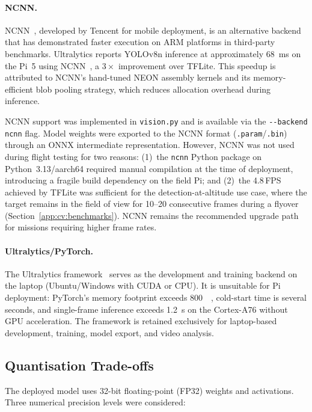\paragraph{NCNN.}
NCNN~\cite{ncnn}, developed by Tencent for mobile deployment, is an alternative backend that has demonstrated faster execution on ARM platforms in third-party benchmarks.  Ultralytics reports YOLOv8n inference at approximately \SI{68}{\milli\second} on the Pi~5 using NCNN~\cite{yolov8}, a $3\times$ improvement over TFLite.  This speedup is attributed to NCNN's hand-tuned NEON assembly kernels and its memory-efficient blob pooling strategy, which reduces allocation overhead during inference.

NCNN support was implemented in \texttt{vision.py} and is available via the \texttt{-{}-backend ncnn} flag.  Model weights were exported to the NCNN format (\texttt{.param}/\texttt{.bin}) through an ONNX intermediate representation.  However, NCNN was not used during flight testing for two reasons: (1)~the \texttt{ncnn} Python package on Python~3.13/aarch64 required manual compilation at the time of deployment, introducing a fragile build dependency on the field Pi; and (2)~the 4.8\,FPS achieved by TFLite was sufficient for the detection-at-altitude use case, where the target remains in the field of view for 10--20 consecutive frames during a flyover (Section~\ref{app:cv:benchmarks}).  NCNN remains the recommended upgrade path for missions requiring higher frame rates.

\paragraph{Ultralytics/PyTorch.}
The Ultralytics framework~\cite{yolov8} serves as the development and training backend on the laptop (Ubuntu/Windows with CUDA or CPU).  It is unsuitable for Pi deployment: PyTorch's memory footprint exceeds \SI{800}{\mega\byte}, cold-start time is several seconds, and single-frame inference exceeds \SI{1.2}{\second} on the Cortex-A76 without GPU acceleration.  The framework is retained exclusively for laptop-based development, training, model export, and video analysis.

\subsection{Quantisation Trade-offs}\label{sec:cv:inference:quant}

The deployed model uses 32-bit floating-point (FP32) weights and activations.  Three numerical precision levels were considered:

